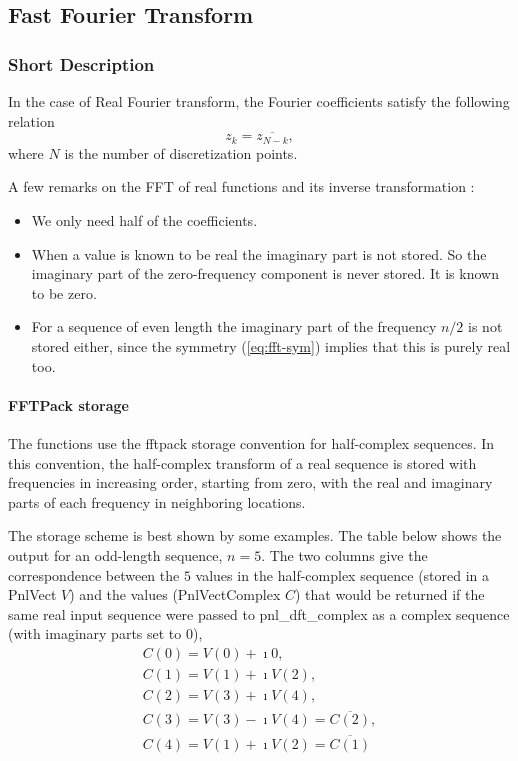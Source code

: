 \subsection{Fast Fourier Transform}
\subsubsection{Short Description}

In the case of Real Fourier transform, the Fourier coefficients satisfy the
following relation
\begin{equation}
  \label{eq:fft-sym}
  z_k = \overline{z_{N-k}},
\end{equation}
where $N$ is the number of discretization points.

A few remarks on the FFT of real functions and its inverse transformation :
\begin{itemize}
\item We only need half of the coefficients.
\item When a value is known to be real the imaginary part is not stored.
  So the imaginary part of the zero-frequency component is never stored. It is
  known to be zero.
\item For a sequence of even length the imaginary part of the frequency
  $n/2$ is not stored either, since the symmetry (\ref{eq:fft-sym}) implies
  that this is purely real too.
\end{itemize}


\paragraph{FFTPack storage}
\label{sec:fftpack-storage}

The functions use the fftpack storage convention for half-complex sequences.
In this convention, the half-complex transform of a real sequence is stored
with frequencies in increasing order, starting from zero, with the real and
imaginary parts of each frequency in neighboring locations.

The storage scheme is best shown by some examples. The table below shows the
output for an odd-length sequence, $n=5$.  The two columns give the
correspondence between the $5$ values in the half-complex sequence (stored in
a PnlVect $V$) and the values (PnlVectComplex $C$) that would be returned if
the same real input sequence were passed to pnl_dft_complex as a complex
sequence (with imaginary parts set to 0),
\begin{equation}
  \begin{array}{l}
    C(0) =  V(0) + \imath 0, \\
    C(1) =  V(1) + \imath V(2), \\
    C(2) =  V(3) + \imath V(4), \\
    C(3) = V(3) - \imath V(4)=  \overline{C(2)} , \\
    C(4) = V(1) + \imath V(2)=  \overline{C(1)}
  \end{array}
\end{equation}

